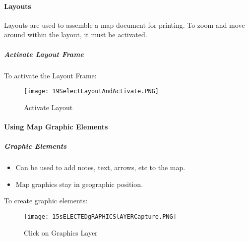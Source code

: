 \clearpage

\paragraph{Layouts}
Layouts are used to assemble a map document for printing.  To zoom and move around within the layout, it must be activated.

\subparagraph{Activate Layout Frame}

To activate the Layout Frame:

\vspace{.25in}



\begin{figure}[h!]
 \centering
     \texttt{[image: 19SelectLayoutAndActivate.PNG]}
 \caption{Activate Layout}


 \end{figure}  


\vspace{.25in}



\clearpage

\paragraph{Using Map Graphic Elements}

\subparagraph{Graphic Elements} 

\begin{itemize}

\item Can be used to add notes, text, arrows, etc to the map.  

\item Map graphics stay in geographic position.

\end{itemize}

\noindent To create graphic elements:


\begin{figure}[h!]
 \centering
     \texttt{[image: 15sELECTEDgRAPHICSlAYERCapture.PNG]}
 \caption{Click on Graphics Layer}

 \end{figure} 


